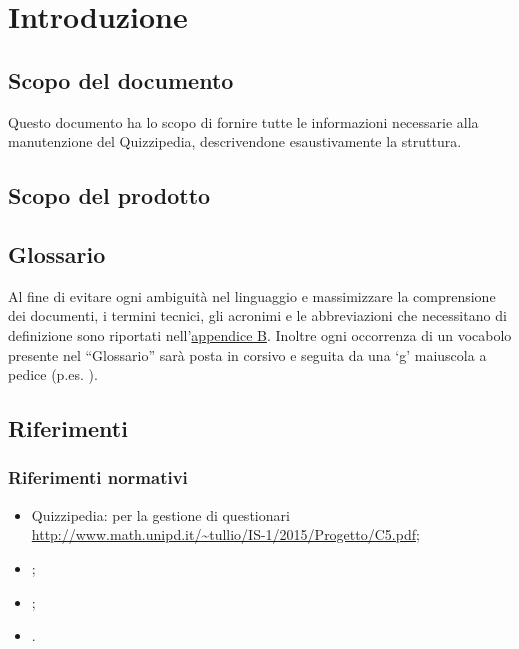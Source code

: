 \documentclass[a4paper, titlepage]{article}
\begin{document}
\pagestyle{fancy}	

\maketitle



\newpage
\tableofcontents

\newpage
\listoffigures

\newpage
\listoftables

\newpage
\clearpage
{}

	\section{Introduzione}
	\subsection{Scopo del documento}
	Questo documento ha lo scopo di fornire tutte le informazioni necessarie alla manutenzione del 
	Quizzipedia, descrivendone esaustivamente la struttura.
	
	\subsection{Scopo del prodotto}
	\SCOPO
	
	\subsection{Glossario}
	Al fine di evitare ogni ambiguità nel linguaggio e massimizzare la comprensione dei documenti, i termini tecnici, gli acronimi e le abbreviazioni che necessitano di definizione sono riportati nell'\hyperref[gl]{appendice B}.
	Inoltre ogni occorrenza di un vocabolo presente nel “Glossario” sarà posta in corsivo e seguita da
	una ‘g’ maiuscola a pedice (p.es. ).
	
	\subsection{Riferimenti}	
	\subsubsection{Riferimenti normativi}
	\begin{itemize}
		\item {} Quizzipedia:  per la gestione di questionari \newline \url{http://www.math.unipd.it/~tullio/IS-1/2015/Progetto/C5.pdf};
		\item {} \NdPdoc;
		\item {} \AdRdoc;
		\item {} \STdoc.
		
	\end{itemize}
	
\end{document}
